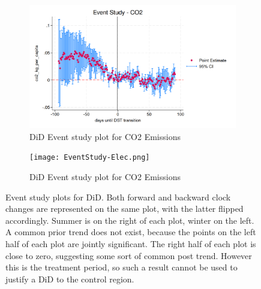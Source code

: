 \begin{figure}[ht]
    \centering
    \begin{subfigure}[t]{0.45\textwidth} 
        \includegraphics[width=\textwidth]{EventStudy-CO2.png}
        \caption{\acs{DiD} Event study plot for CO2 Emissions}
        \label{fig:dd event study co2}
    \end{subfigure}
    \hfill 
    \begin{subfigure}[t]{0.45\textwidth} 
        \texttt{[image: EventStudy-Elec.png]} 
        \caption{\acs{DiD} Event study plot for CO2 Emissions} %
        \label{fig:dd event study elec}
    \end{subfigure}
   \caption[Event study plots for \acs{DiD}]{Event study plots for \acs{DiD}. Both forward and backward clock changes are represented on the same plot, with the latter flipped accordingly. Summer is on the right of each plot, winter on the left. A common prior trend does not exist, because the points on the left half of each plot are jointly significant. The right half of each plot is close to zero, suggesting some sort of common post trend. However this is the treatment period, so such a result cannot be used to justify a \ac{DiD} to the control region.}
    \label{fig:dd event study}
\end{figure}


